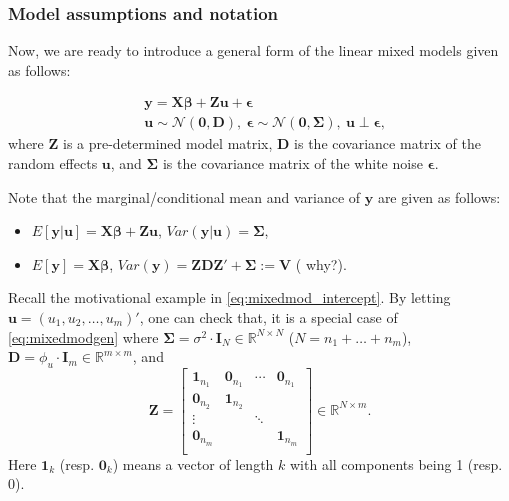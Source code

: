 \documentclass[ignorenonframetext,]{beamer}
\begin{document}
\begin{frame}[allowframebreaks]
\frametitle{Model assumptions and notation}

Now, we are ready to introduce a general form of the linear mixed models given as follows:

\begin{equation} \label{eq:mixedmodgen}
\begin{aligned}
&\bm{y} = \bm{X\beta + Zu + \epsilon} \\
&\bm{u} \sim \mathcal{N}(\bm{0, D}), \ \bm{\epsilon} \sim \mathcal{N}(\bm{0, \Sigma}), \ \bm{u} \perp \bm{\epsilon},
\end{aligned}
\end{equation}
where $\bm{Z}$ is a pre-determined model matrix, $\bm{D}$ is the covariance matrix of the random effects $\bm{u}$, and $\bm{\Sigma}$ is the covariance matrix of the white noise $\bm{\epsilon}$. 

Note that the marginal/conditional mean and variance of $\mathbf{y}$ are given as follows:
\begin{itemize}
	\item $E[\bm{y}|\bm{u}] = \bm{X\beta + Zu}$, $Var(\bm{y}|\bm{u}) = \bm{\Sigma}$,
	\item $E[\bm{y}] = \bm{X\beta}$, $Var(\bm{y}) = \bm{ZDZ' + \Sigma:= V}$ ({\color{red} why?}).
\end{itemize}

\framebreak

\begin{exam}
Recall the motivational example in \eqref{eq:mixedmod_intercept}. By letting $\bm{u}=(u_1, u_2, \ldots, u_m)'$, one can check that, it is a special case of \eqref{eq:mixedmodgen} where $\bm{\Sigma} = \sigma^2 \cdot \bm{I}_{N} \in \mathbb{R}^{N \times N}$ ($N = n_1 + \ldots+ n_m$), $\bm{D}= \phi_u \cdot \bm{I}_{{m}}\in \mathbb{R}^{{m} \times {m}}$, and
$$
\bm{Z}=\begin{bmatrix}
\bm{1}_{n_1} & \bm{0}_{n_1} & \cdots & \bm{0}_{n_1} \\
\bm{0}_{n_2} & \bm{1}_{n_2} &  &  \\
\vdots &  & \ddots &  \\
\bm{0}_{n_m} &  &  & \bm{1}_{n_m} \\
\end{bmatrix}\in \mathbb{R}^{N \times m}.
$$
Here $\bm{1}_{k}$ (resp. $\bm{0}_{k}$) means a vector of length $k$ with all components being 1 (resp. 0).
\end{exam}


\end{frame}
\end{document}
